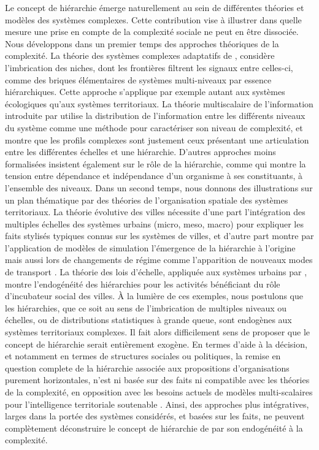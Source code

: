 \documentclass[11pt]{article}
\begin{document}
Le concept de hiérarchie émerge naturellement au sein de différentes théories et modèles des systèmes complexes. Cette contribution vise à illustrer dans quelle mesure une prise en compte de la complexité sociale ne peut en être dissociée. Nous développons dans un premier temps des approches théoriques de la complexité. La théorie des systèmes complexes adaptatifs de \cite{holland2012signals}, considère l'imbrication des niches, dont les frontières filtrent les signaux entre celles-ci, comme des briques élémentaires de systèmes multi-niveaux par essence hiérarchiques. Cette approche s'applique par exemple autant aux systèmes écologiques qu'aux systèmes territoriaux. La théorie multiscalaire de l'information introduite par \cite{allen2017multiscale} utilise la distribution de l'information entre les différents niveaux du système comme une méthode pour caractériser son niveau de complexité, et montre que les profils complexes sont justement ceux présentant une articulation entre les différentes échelles et une hiérarchie. D'autres approches moins formalisées insistent également sur le rôle de la hiérarchie, comme \cite{morin1980methode} qui montre la tension entre dépendance et indépendance d'un organisme à ses constituants, à l'ensemble des niveaux. Dans un second temps, nous donnons des illustrations sur un plan thématique par des théories de l'organisation spatiale des systèmes territoriaux. La théorie évolutive des villes \citep{pumain2018evolutionary} nécessite d'une part l'intégration des multiples échelles des systèmes urbains (micro, meso, macro) pour expliquer les faits stylisés typiques connus sur les systèmes de villes, et d'autre part montre par l'application de modèles de simulation l'émergence de la hiérarchie à l'origine \citep{pumain2017simpoplocal} mais aussi lors de changements de régime comme l'apparition de nouveaux modes de transport \citep{raimbault2018modeling}. La théorie des lois d'échelle, appliquée aux systèmes urbains par \cite{bettencourt2007growth}, montre l'endogénéité des hiérarchies pour les activités bénéficiant du rôle d'incubateur social des villes. À la lumière de ces exemples, nous postulons que les hiérarchies, que ce soit au sens de l'imbrication de multiples niveaux ou échelles, ou de distributions statistiques à grande queue, sont endogènes aux systèmes territoriaux complexes. Il fait alors difficilement sens de proposer que le concept de hiérarchie serait entièrement exogène. En termes d'aide à la décision, et notamment en termes de structures sociales ou politiques, la remise en question complete de la hiérarchie associée aux propositions d'organisations purement horizontales, n'est ni basée sur des faits ni compatible avec les théories de la complexité, en opposition avec les besoins actuels de modèles multi-scalaires pour l'intelligence territoriale soutenable \citep{rozenblat2018conclusion}. Ainsi, des approches plus intégratives, larges dans la portée des systèmes considérés, et basées sur les faits, ne peuvent complètement déconstruire le concept de hiérarchie de par son endogénéité à la complexité.








\footnotesize



\end{document}
